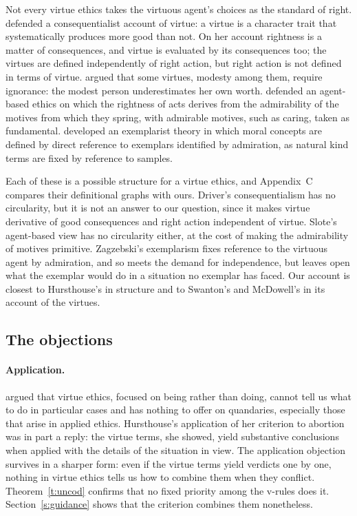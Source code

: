 \documentclass{situationist-preprint}
\begin{document}
Not every virtue ethics takes the virtuous agent's choices as the standard of right. \citet{Driver2001} defended a consequentialist account of virtue: a virtue is a character trait that systematically produces more good than not. On her account rightness is a matter of consequences, and virtue is evaluated by its consequences too; the virtues are defined independently of right action, but right action is not defined in terms of virtue. \citet{Driver1989} argued that some virtues, modesty among them, require ignorance: the modest person underestimates her own worth. \citet{Slote2001} defended an agent-based ethics on which the rightness of acts derives from the admirability of the motives from which they spring, with admirable motives, such as caring, taken as fundamental. \citet{Zagzebski2017} developed an exemplarist theory in which moral concepts are defined by direct reference to exemplars identified by admiration, as natural kind terms are fixed by reference to samples.

Each of these is a possible structure for a virtue ethics, and Appendix~C compares their definitional graphs with ours. Driver's consequentialism has no circularity, but it is not an answer to our question, since it makes virtue derivative of good consequences and right action independent of virtue. Slote's agent-based view has no circularity either, at the cost of making the admirability of motives primitive. Zagzebski's exemplarism fixes reference to the virtuous agent by admiration, and so meets the demand for independence, but leaves open what the exemplar would do in a situation no exemplar has faced. Our account is closest to Hursthouse's in structure and to Swanton's and McDowell's in its account of the virtues.

\subsection{The objections}

\paragraph{Application.} \citet{Louden1984} argued that virtue ethics, focused on being rather than doing, cannot tell us what to do in particular cases and has nothing to offer on quandaries, especially those that arise in applied ethics. Hursthouse's application of her criterion to abortion \citep{Hursthouse1991} was in part a reply: the virtue terms, she showed, yield substantive conclusions when applied with the details of the situation in view. The application objection survives in a sharper form: even if the virtue terms yield verdicts one by one, nothing in virtue ethics tells us how to combine them when they conflict. Theorem~\ref{t:uncod} confirms that no fixed priority among the v-rules does it. Section~\ref{s:guidance} shows that the criterion combines them nonetheless.
\end{document}
